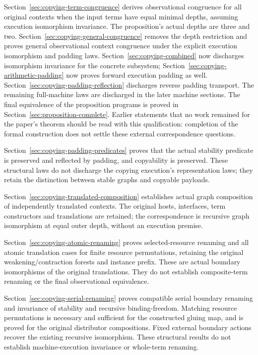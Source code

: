 Section~\ref{sec:copying-term-congruence} derives observational congruence for
all original contexts when the input terms have equal minimal depths, assuming
execution isomorphism invariance. The proposition's actual depths are three
and two. Section~\ref{sec:copying-general-congruence} removes the depth
restriction and proves general observational context congruence under the
explicit execution isomorphism and padding laws. Section~\ref{sec:copying-combined}
now discharges isomorphism invariance for the concrete subsystem; Section~\ref{sec:copying-arithmetic-padding} now proves
forward execution padding as well. Section~\ref{sec:copying-padding-reflection}
discharges reverse padding transport. The remaining full-machine laws are
discharged in the later machine sections. The final equivalence of the
proposition programs is proved in Section~\ref{sec:proposition-complete}.
Earlier statements that no work remained for the paper's theorem should be
read with this qualification: completion of the formal construction does not
settle these external correspondence questions.
\clearpage


Section~\ref{sec:copying-padding-predicates} proves that the actual stability
predicate is preserved and reflected by padding, and copyability is preserved.
These structural laws do not discharge the copying execution's representation
laws; they retain the distinction between stable graphs and copyable payloads.


Section~\ref{sec:copying-translated-composition} establishes actual graph
composition of independently translated contexts. The original hosts,
interfaces, term constructors and translations are retained; the correspondence
is recursive graph isomorphism at equal outer depth, without an execution premise.


Section~\ref{sec:copying-atomic-renaming} proves selected-resource renaming and
all atomic translation cases for finite resource permutations, retaining the
original weakening/contraction forests and instance prefix. These are actual
boundary isomorphisms of the original translations. They do not establish
composite-term renaming or the final observational equivalence.


Section~\ref{sec:copying-serial-renaming} proves compatible serial boundary
renaming and invariance of stability and recursive binding-freedom. Matching
resource permutations is necessary and sufficient for the constructed gluing
map, and is proved for the original distributor compositions. Fixed external
boundary actions recover the existing recursive isomorphism. These structural
results do not establish machine-execution invariance or whole-term renaming.


